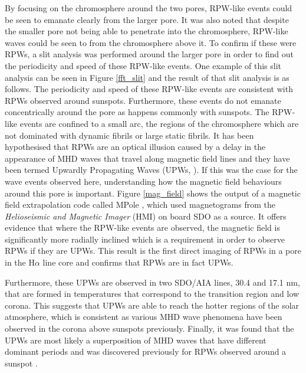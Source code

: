     By focusing on the chromosphere around the two pores, RPW-like events could be seen to emanate clearly from the larger pore.
    It was also noted that despite the smaller pore not being able to penetrate into the chromosphere, RPW-like waves could be seen to from the chromosphere above it. 
    To confirm if these were RPWs, a slit analysis was performed around the larger pore in order to find out the periodicity and speed of these RPW-like events.
    One example of this slit analysis can be seen in Figure \ref{fft_slit} and the result of that slit analysis is as follows.
    The periodicity and speed of these RPW-like events are consistent with RPWs observed around sunspots.
    Furthermore, these events do not emanate concentrically around the pore as happens commonly with sunspots.
    The RPW-like events are confined to a small arc, the regions of the chromosphere which are not dominated with dynamic fibrils or large static fibrils.
    It has been hypothesised that RPWs are an optical illusion caused by a delay in the appearance of MHD waves that travel along magnetic field lines and they have been termed Upwardly Propagating Waves (UPWs, \citealt{Bloomfiel2008}).
    If this was the case for the wave events observed here, understanding how the magnetic field behaviours around this pore is important. 
	Figure \ref{mag_field} shows the output of a magnetic field extrapolation code called MPole \citep{Longcope1996,Longcope2002}, which used magnetograms from the \textit{Helioseismic and Magnetic Imager} (HMI) on board SDO as a source.
	It offers evidence that where the RPW-like events are observed, the magnetic field is significantly more radially inclined which is a requirement in order to observe RPWs if they are UPWs. 
	This result is the first direct imaging of RPWs in a pore in the H$\alpha$ line core and confirms that RPWs are in fact UPWs.
	 
	Furthermore, these UPWs are observed in two SDO/AIA lines, 30.4 and 17.1 nm, that are formed in temperatures that correspond to the transition region and low corona.
	This suggests that UPWs are able to reach the hotter regions of the solar atmosphere, which is consistent as various MHD wave phenomena have been observed in the corona above sunspots previously. 
	Finally, it was found that the UPWs are most likely a superposition of MHD waves that have different dominant periods and was discovered previously for RPWs observed around a sunspot \citep{Jess2013}. 
	
